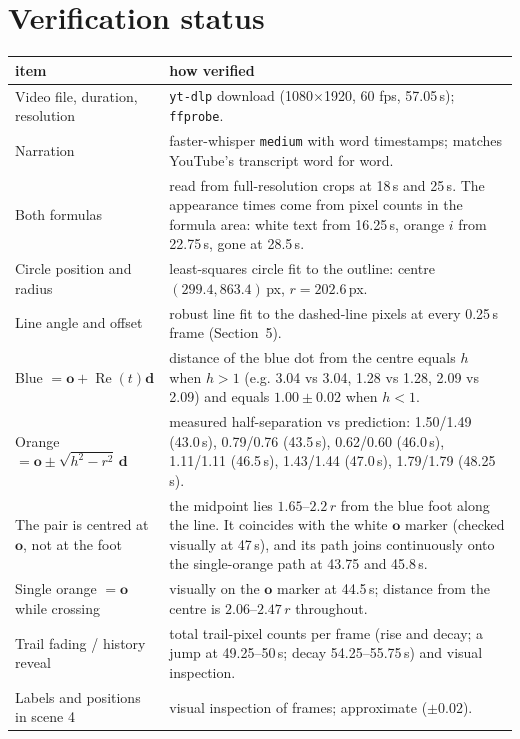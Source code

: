 \documentclass[10pt,a4paper]{article}
\newcommand{\vo}{\mathbf{o}}\newcommand{\vd}{\mathbf{d}}\newcommand{\vp}{\mathbf{p}}
\begin{document}
\section{Verification status}
\begin{longtable}{@{}p{55mm}p{110mm}@{}}
\toprule
item & how verified\\\midrule\endhead
Video file, duration, resolution & \texttt{yt-dlp} download (1080$\times$1920, 60 fps, 57.05\,s); \texttt{ffprobe}.\\
Narration & faster-whisper \texttt{medium} with word timestamps; matches YouTube's transcript word for word.\\
Both formulas & read from full-resolution crops at 18\,s and 25\,s. The appearance times come from pixel counts in the formula area: white text from 16.25\,s, orange $i$ from 22.75\,s, gone at 28.5\,s.\\
Circle position and radius & least-squares circle fit to the outline: centre $(299.4,863.4)$\,px, $r=202.6$\,px.\\
Line angle and offset & robust line fit to the dashed-line pixels at every 0.25\,s frame (Section~5).\\
Blue $=\vo+\operatorname{Re}(t)\vd$ & distance of the blue dot from the centre equals $h$ when $h>1$ (e.g. 3.04 vs 3.04, 1.28 vs 1.28, 2.09 vs 2.09) and equals $1.00\pm0.02$ when $h<1$.\\
Orange $=\vo\pm\sqrt{h^2-r^2}\,\vd$ & measured half-separation vs prediction: 1.50/1.49 (43.0\,s), 0.79/0.76 (43.5\,s), 0.62/0.60 (46.0\,s), 1.11/1.11 (46.5\,s), 1.43/1.44 (47.0\,s), 1.79/1.79 (48.25\,s).\\
The pair is centred at $\vo$, not at the foot & the midpoint lies $1.65$--$2.2\,r$ from the blue foot along the line. It coincides with the white $\vo$ marker (checked visually at 47\,s), and its path joins continuously onto the single-orange path at 43.75 and 45.8\,s.\\
Single orange $=\vo$ while crossing & visually on the $\vo$ marker at 44.5\,s; distance from the centre is $2.06$--$2.47\,r$ throughout.\\
Trail fading / history reveal & total trail-pixel counts per frame (rise and decay; a jump at 49.25--50\,s; decay 54.25--55.75\,s) and visual inspection.\\
Labels and positions in scene 4 & visual inspection of frames; approximate ($\pm0.02$).\\
\bottomrule
\end{longtable}
\end{document}
